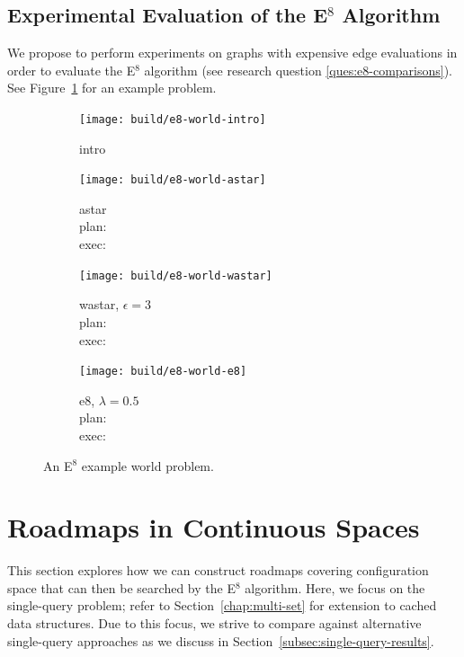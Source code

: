 \subsection{Experimental Evaluation of the E$^8$ Algorithm}

We propose to perform experiments on graphs with
expensive edge evaluations
in order to evaluate the E$^8$ algorithm
(see research question \ref{ques:e8-comparisons}).
See Figure~\ref{fig:e8-results} for an example problem.

\begin{figure}
   \centering
   
   
   
   \begin{subfigure}[t]{0.47\textwidth}
      \centering
      \texttt{[image: build/e8-world-intro]}
      \caption{intro}
   \end{subfigure}%
   \quad%
   \begin{subfigure}[t]{0.47\textwidth}
      \centering
      \texttt{[image: build/e8-world-astar]}
      \caption{astar\\
         plan: \worldstatsastarplan\\
         exec: \worldstatsastarexec}
   \end{subfigure}%
   \quad%
   \begin{subfigure}[t]{0.47\textwidth}
      \centering
      \texttt{[image: build/e8-world-wastar]}
      \caption{wastar, $\epsilon=3$\\
         plan: \worldstatswastarplan\\
         exec: \worldstatswastarexec}
   \end{subfigure}%
   \quad%
   \begin{subfigure}[t]{0.47\textwidth}
      \centering
      \texttt{[image: build/e8-world-e8]}
      \caption{e8, $\lambda=0.5$\\
         plan: \worldstatseEplan\\
         exec: \worldstatseEexec}
   \end{subfigure}
   \caption{An E$^8$ example world problem.}
   \label{fig:e8-results}
\end{figure}

\section{Roadmaps in Continuous Spaces}
\label{chap:graphs-in-continuous}

This section explores how we can construct roadmaps covering
configuration space that can then be searched by the E$^8$ algorithm.
Here,
we focus on the single-query problem;
refer to Section~\ref{chap:multi-set}
for extension to cached data structures.
Due to this focus,
we strive to compare against alternative single-query approaches
as we discuss in Section~\ref{subsec:single-query-results}.

